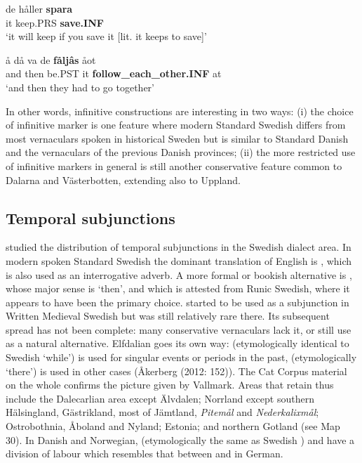 \ea\label{}
\gll de  håller  \textbf{spara}\\
it  keep.PRS  \textbf{save.INF}\\
\glt ‘it will keep if you save it [lit. it keeps to save]’
\z

\ea\label{}
\gll å  då  va  de  \textbf{fåljâs} åot\\
and  then  be.PST  it  \textbf{follow\_each\_other.INF} at\\
\glt ‘and then they had to go together’ 
\z

In other words, infinitive constructions are interesting in two ways: (i) the choice of infinitive marker is one feature where modern Standard Swedish differs from most vernaculars spoken in historical Sweden but is similar to Standard Danish and the vernaculars of the previous Danish provinces; (ii) the more restricted use of infinitive markers in general is still another conservative feature common to Dalarna and Västerbotten, extending also to Uppland. 


\subsection{Temporal subjunctions}

\citet{Vallmark1936} studied the distribution of temporal subjunctions in the Swedish dialect area. In modern spoken Standard Swedish the dominant translation of English  is , which is also used as an interrogative adverb. A more formal or bookish alternative is , whose major sense is ‘then’, and which is attested from Runic Swedish, where it appears to have been the primary choice. started to be used as a subjunction in Written Medieval Swedish but was still relatively rare there. Its subsequent spread has not been complete: many conservative vernaculars lack it, or still use as a natural alternative. Elfdalian goes its own way:  (etymologically identical to Swedish  ‘while’) is used for singular events or periods in the past,  (etymologically ‘there’) is used in other cases (Åkerberg (2012: 152)). The Cat Corpus material on the whole confirms the picture given by Vallmark. Areas that retain  thus include the Dalecarlian area except Älvdalen; Norrland except southern Hälsingland, Gästrikland, most of Jämtland, \textit{Pitemål} and \textit{Nederkalixmål}; Ostrobothnia, Åboland and Nyland; Estonia; and northern Gotland (see Map 30). In Danish and Norwegian,  (etymologically the same as Swedish ) and  have a division of labour which resembles that between  and  in German. 

